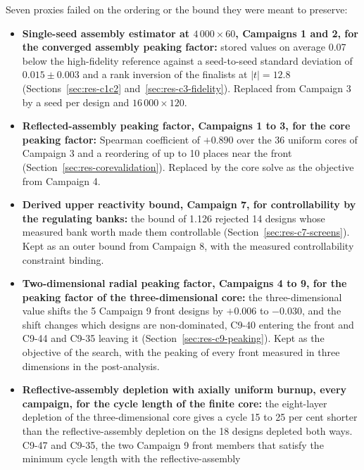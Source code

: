 Seven proxies failed on the ordering or the bound they were meant to
preserve:

\begin{itemize}
  \item \textbf{Single-seed assembly estimator at $4\,000\times60$,
        Campaigns 1 and 2, for the converged assembly peaking factor:}
        stored values on average 0.07 below the high-fidelity
        reference against a seed-to-seed standard deviation of
        $0.015 \pm 0.003$ and a rank inversion of the finalists at
        $|t| = 12.8$ (Sections~\ref{sec:res-c1c2}
        and~\ref{sec:res-c3-fidelity}). Replaced from Campaign 3 by a
        seed per design and $16\,000\times120$.
  \item \textbf{Reflected-assembly peaking factor, Campaigns 1 to 3,
        for the core peaking factor:} Spearman coefficient of $+0.890$
        over the 36 uniform cores of Campaign 3 and a reordering of up
        to 10 places near the front
        (Section~\ref{sec:res-corevalidation}). Replaced by the core
        solve as the objective from Campaign 4.
  \item \textbf{Derived upper reactivity bound, Campaign 7, for
        controllability by the regulating banks:} the bound of 1.126
        rejected 14 designs whose measured bank worth made them
        controllable (Section~\ref{sec:res-c7-screens}). Kept as an
        outer bound from Campaign 8, with the measured controllability
        constraint binding.
  \item \textbf{Two-dimensional radial peaking factor, Campaigns 4 to
        9, for the peaking factor of the three-dimensional core:} the
        three-dimensional value shifts the 5 Campaign 9 front designs
        by $+0.006$ to $-0.030$, and the shift changes which designs
        are non-dominated, C9-40 entering the front and C9-44 and C9-35
        leaving it (Section~\ref{sec:res-c9-peaking}). Kept as the
        objective of the search, with the peaking of every front
        measured in three dimensions in the post-analysis.
  \item \textbf{Reflective-assembly depletion with axially uniform
        burnup, every campaign, for the cycle length of the finite
        core:} the eight-layer depletion of the three-dimensional core
        gives a cycle 15 to 25 per cent shorter than the
        reflective-assembly depletion on the 18 designs depleted both
        ways. C9-47 and C9-35, the two Campaign 9 front members that
        satisfy the minimum cycle length with the reflective-assembly

\end{itemize}
